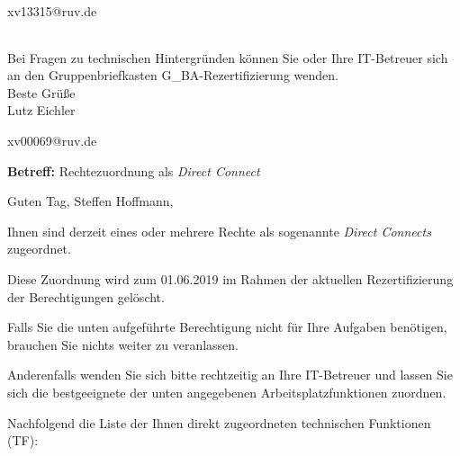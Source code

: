 \documentclass[a4paper,landscape,12pt]{letter}
\begin{document}
\begin{letter}{xv13315@ruv.de\hfill \break}
\begin{tiny}
\begin{longtable}{|p{35mm}|p{15mm}|p{25mm}|p{10mm}|p{40mm}|p{50mm}|p{50mm}|}
\hline
		\end{longtable}
		\end{tiny}
	
\begin{minipage}{\textwidth}
			Bei Fragen zu technischen Hintergründen können Sie 
			oder Ihre IT-Betreuer sich an den Gruppenbriefkasten 
			G\_BA-Rezertifizierung
			wenden.\\
			\linebreak
			Beste Grüße\\
			Lutz Eichler
	\end{minipage}
	\end{letter}
	
\begin{letter}{xv00069@ruv.de\hfill \break}
\begin{normalsize}
	\opening{\textbf{Betreff:} Rechtezuordnung als \emph{Direct Connect}}
	\begin{normalsize} \hfill
	\end{normalsize}

	\begin{normalsize}
		Guten Tag, 
	Steffen Hoffmann, \hfill \break
	\end{normalsize}
	\end{normalsize}
	
\begin{normalsize}
	Ihnen sind derzeit eines oder mehrere Rechte als sogenannte \emph{Direct Connects} zugeordnet.
	
	Diese Zuordnung wird zum 01.06.2019 im Rahmen der aktuellen Rezertifizierung der Berechtigungen gelöscht.
	
	Falls Sie die unten aufgeführte Berechtigung nicht für Ihre Aufgaben benötigen, 
	brauchen Sie nichts weiter zu veranlassen.
	
	Anderenfalls wenden Sie sich bitte rechtzeitig an Ihre IT-Betreuer 
	und lassen Sie sich die bestgeeignete der unten angegebenen Arbeitsplatzfunktionen zuordnen.
	\end{normalsize}
	
\begin{normalsize}
	Nachfolgend die Liste der Ihnen direkt zugeordneten technischen Funktionen (TF):


\end{normalsize}
\end{letter}
\end{document}
